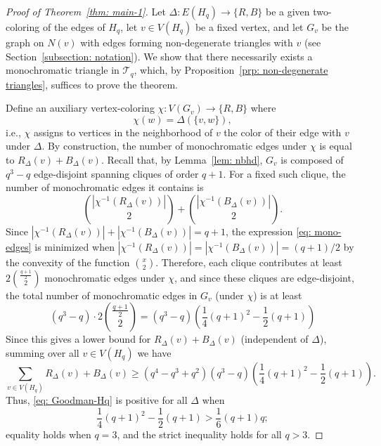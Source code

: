 \documentclass[A4paper,reqno,oneside,12pt]{amsart}
\theoremstyle{plain}
\theoremstyle{definition}
\newcommand{\scT}{\mathscr{T}}
\begin{document}
\begin{proof}[Proof of Theorem~\ref{thm: main-1}]
Let $\Delta: E(H_q) \to \{R,B\}$ be a given two-coloring of the edges of $H_q$, let $v \in V(H_q)$ be a fixed vertex, and let $G_v$ be the graph on $N(v)$ with edges forming non-degenerate triangles with $v$ (see Section~\ref{subsection: notation}).
We show that there necessarily exists a monochromatic triangle in $\scT_q$, which, by Proposition~\ref{prp: non-degenerate triangles}, suffices to prove the theorem.

Define an auxiliary vertex-coloring $\chi: V(G_v) \to \{R,B\}$ where
\begin{equation*}
    \chi(w) = \Delta(\{v,w\}),
\end{equation*}
i.e., $\chi$ assigns to vertices in the neighborhood of $v$ the color of their edge with $v$ under $\Delta$.
By construction, the number of monochromatic edges under $\chi$ is equal to $R_\Delta(v) + B_\Delta(v)$.
Recall that, by Lemma~\ref{lem: nbhd}, $G_v$ is composed of $q^3-q$ edge-disjoint spanning cliques of order $q+1$.
For a fixed such clique, the number of monochromatic edges it contains is 
\begin{equation}
\label{eq: mono-edges}
    \binom{|\chi^{-1}(R_\Delta(v))|}{2} + \binom{|\chi^{-1}(B_\Delta(v))|}{2}.
\end{equation}
Since $|\chi^{-1}(R_\Delta(v))| + |\chi^{-1}(B_\Delta(v))| = q+1$, the expression \eqref{eq: mono-edges} is minimized when $|\chi^{-1}(R_\Delta(v))| = |\chi^{-1}(B_\Delta(v))| = (q+1)/2$ by the convexity of the function $\binom{x}{2}$.
Therefore, each clique contributes at least $2 \binom{\frac{q+1}{2}}{2}$ monochromatic edges under $\chi$, and since these cliques are edge-disjoint, the total number of monochromatic edges in $G_v$ (under $\chi$) is at least
\begin{equation*}
    (q^3-q) \cdot 2 \binom{\frac{q+1}{2}}{2} 
    = (q^3-q) \left( \frac{1}{4}(q+1)^2 - \frac{1}{2}(q+1) \right)
\end{equation*}
Since this gives a lower bound for $R_\Delta(v) + B_\Delta(v)$ (independent of $\Delta$), summing over all $v \in V(H_q)$ we have
\begin{equation*}
    \sum_{v \in V(H_q)} R_\Delta(v) + B_\Delta(v) \geq (q^4-q^3+q^2) (q^3-q) \left( \frac{1}{4}(q+1)^2 - \frac{1}{2}(q+1) \right).
\end{equation*}
Thus, \eqref{eq: Goodman-Hq} is 
positive for all $\Delta$ when
\begin{equation}
\label{eqn: q geq 4}
    \frac{1}{4}(q+1)^2 - \frac{1}{2}(q+1) > \frac{1}{6}(q+1)q;
\end{equation}
equality holds when $q=3$, and the strict inequality holds for all $q > 3$.


\end{proof}
\end{document}
